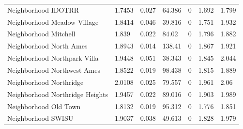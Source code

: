 \documentclass{article}
\begin{document}
\begin{table}[]
\begin{tabular}{lllllll}
		Neighborhood IDOTRR              & 1.7453                    & 0.027                        & 64.386                 & 0                                       & 1.692                         & 1.799                         \\
		Neighborhood Meadow Village      & 1.8414                    & 0.046                        & 39.816                 & 0                                       & 1.751                         & 1.932                         \\
		Neighborhood Mitchell            & 1.839                     & 0.022                        & 84.02                  & 0                                       & 1.796                         & 1.882                         \\
		Neighborhood North Ames          & 1.8943                    & 0.014                        & 138.41                 & 0                                       & 1.867                         & 1.921                         \\
		Neighborhood  Northpark Villa    & 1.9448                    & 0.051                        & 38.343                 & 0                                       & 1.845                         & 2.044                         \\
		Neighborhood Northwest Ames      & 1.8522                    & 0.019                        & 98.438                 & 0                                       & 1.815                         & 1.889                         \\
		Neighborhood Northridge          & 2.0108                    & 0.025                        & 79.557                 & 0                                       & 1.961                         & 2.06                          \\
		Neighborhood Northridge Heights  & 1.9457                    & 0.022                        & 89.016                 & 0                                       & 1.903                         & 1.989                         \\
		Neighborhood Old Town            & 1.8132                    & 0.019                        & 95.312                 & 0                                       & 1.776                         & 1.851                         \\
		Neighborhood SWISU               & 1.9037                    & 0.038                        & 49.613                 & 0                                       & 1.828                         & 1.979                         \\

\end{tabular}
\end{table}
\end{document}
